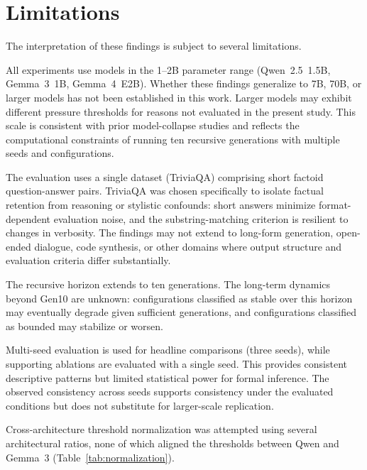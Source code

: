 \documentclass[a4paper,fleqn]{cas-dc}
\begin{document}
\section{Limitations}\label{sec:limitations}

The interpretation of these findings is subject to several limitations.

All experiments use models in the 1--2B parameter range (Qwen~2.5~1.5B,
Gemma~3~1B, Gemma~4~E2B). Whether these findings generalize to 7B, 70B, or
larger models has not been established in this work. Larger models may exhibit
different pressure thresholds for reasons not evaluated in the present study.
This scale is consistent with prior model-collapse studies
\citep{shumailov2024,keisha2025} and reflects the computational constraints of
running ten recursive generations with multiple seeds and configurations.

The evaluation uses a single dataset (TriviaQA) comprising short factoid
question-answer pairs. TriviaQA was chosen specifically to isolate factual
retention from reasoning or stylistic confounds: short answers minimize
format-dependent evaluation noise, and the substring-matching criterion is
resilient to changes in verbosity. The findings may not extend to long-form
generation, open-ended dialogue, code synthesis, or other domains where output
structure and evaluation criteria differ substantially.

The recursive horizon extends to ten generations. The long-term dynamics beyond
Gen10 are unknown: configurations classified as stable over this horizon
may eventually degrade given sufficient generations, and configurations
classified as bounded may stabilize or worsen.

Multi-seed evaluation is used for headline comparisons (three seeds), while
supporting ablations are evaluated with a single seed. This provides consistent
descriptive patterns but limited statistical power for formal inference. The
observed consistency across seeds supports consistency under the evaluated
conditions but does not substitute for larger-scale replication.

Cross-architecture threshold normalization was attempted using several
architectural ratios, none of which aligned the thresholds between Qwen and
Gemma~3 (Table~\ref{tab:normalization}).
\end{document}

